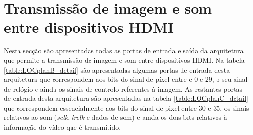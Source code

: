 \begin{longtable}[h!]
	\hline
\end{longtable}

\section{Transmissão de imagem e som entre dispositivos HDMI} \label{ap3:imagem_som_RX_TX}

Nesta secção são apresentadas todas as portas de entrada e saída da arquitetura que permite a transmissão de imagem e som entre dispositivos HDMI. Na tabela \ref{table:LOCplanB_detail} são apresentadas algumas portas de entrada desta arquitetura que correspondem aos bits do sinal de píxel entre e 0 e 29, o seu sinal de relógio e ainda os sinais de controlo referentes à imagem. As restantes portas de entrada desta arquitetura são apresentadas na tabela \ref{table:LOCplanC_detail} que correspondem essencialmente aos bits do sinal de pixel entre 30 e 35, os sinais relativos ao som (\textit{sclk}, \textit{lrclk} e dados de som) e ainda os dois bits relativos à informação do vídeo que é transmitido.

